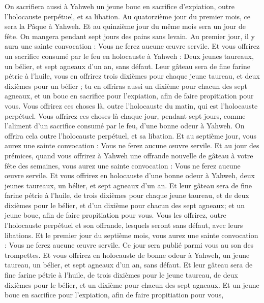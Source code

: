 \begin{multicols}{2}
On sacrifiera aussi à Yahweh un jeune bouc en sacrifice d'expiation, outre l'holocauste perpétuel, et sa libation.
Au quatorzième jour du premier mois, ce sera la Pâque à Yahweh.
Et au quinzième jour du même mois sera un jour de fête. On mangera pendant sept jours des pains sans levain.
Au premier jour, il y aura une sainte convocation : Vous ne ferez aucune œuvre servile.
Et vous offrirez un sacrifice consumé par le feu en holocauste à Yahweh : Deux jeunes taureaux, un bélier, et sept agneaux d'un an, sans défaut.
Leur gâteau sera de fine farine pétrie à l'huile, vous en offrirez trois dixièmes pour chaque jeune taureau, et deux dixièmes pour un bélier ;
tu en offriras aussi un dixième pour chacun des sept agneaux,
et un bouc en sacrifice pour l'expiation, afin de faire propitiation pour vous.
Vous offrirez ces choses là, outre l'holocauste du matin, qui est l'holocauste perpétuel.
Vous offrirez ces choses-là chaque jour, pendant sept jours, comme l'aliment d'un sacrifice consumé par le feu, d'une bonne odeur à Yahweh. On offrira cela outre l'holocauste perpétuel, et sa libation.
Et au septième jour, vous aurez une sainte convocation : Vous ne ferez aucune œuvre servile.
Et au jour des prémices, quand vous offrirez à Yahweh une offrande nouvelle de gâteau à votre fête des semaines, vous aurez une sainte convocation : Vous ne ferez aucune œuvre servile.
Et vous offrirez en holocauste d'une bonne odeur à Yahweh, deux jeunes taureaux, un bélier, et sept agneaux d'un an.
Et leur gâteau sera de fine farine pétrie à l'huile, de trois dixièmes pour chaque jeune taureau, et de deux dixièmes pour le bélier,
et d'un dixième pour chacun des sept agneaux;
et un jeune bouc, afin de faire propitiation pour vous.
Vous les offrirez, outre l'holocauste perpétuel et son offrande, lesquels seront sans défaut, avec leurs libations.
\VerseOne{}Et le premier jour du septième mois, vous aurez une sainte convocation : Vous ne ferez aucune œuvre servile. Ce jour sera publié parmi vous au son des trompettes.
Et vous offrirez en holocauste de bonne odeur à Yahweh, un jeune taureau, un bélier, et sept agneaux d'un an, sans défaut.
Et leur gâteau sera de fine farine pétrie à l'huile, de trois dixièmes pour le jeune taureau, de deux dixièmes pour le bélier,
et un dixième pour chacun des sept agneaux.
Et un jeune bouc en sacrifice pour l'expiation, afin de faire propitiation pour vous,

\end{multicols}
